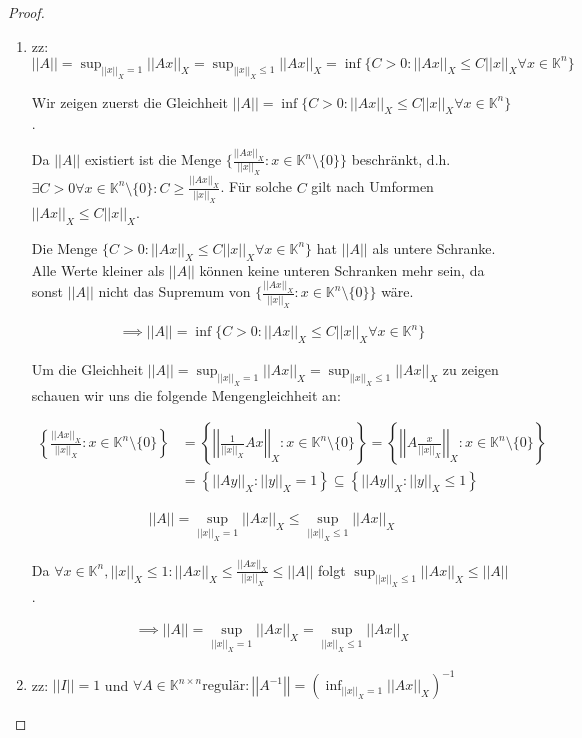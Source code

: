 \documentclass[]{article}
\newcommand{\norm}[1]{\left|\left|#1\right|\right|}
\newcommand{\normx}[1]{\norm{#1}_X}
\newcommand{\supo}{\sup_{\normx{x}=1}}
\newcommand{\supl}{\sup_{\normx{x}\leq1}}
\begin{document}
\begin{proof}
\begin{enumerate}[label=\alph*)]
		\item zz: $\norm{A}=\supo\normx{Ax}=\supl\normx{Ax}=\inf\{C>0: \normx{Ax}\leq C\normx{x} \forall x \in \mathbb{K}^n\}$
		
		Wir zeigen zuerst die Gleichheit $\norm{A}=\inf\{C>0: \normx{Ax}\leq C\normx{x} \forall x \in \mathbb{K}^n\}$.
		
		Da $\norm{A}$ existiert ist die Menge $\{\frac{\normx{Ax}}{\normx{x}}:x\in\mathbb{K}^n\setminus\{0\}\}$ beschränkt, d.h. $\exists C>0 \forall x\in\mathbb{K}^n\setminus\{0\} : C \geq \frac{\normx{Ax}}{\normx{x}}$. Für solche $C$ gilt nach Umformen $\normx{Ax}\leq C\normx{x}$.
		
		Die Menge $\{C>0:\normx{Ax}\leq C\normx{x} \forall x \in \mathbb{K}^n\}$ hat $\norm{A}$ als untere Schranke. Alle Werte kleiner als $\norm{A}$ können keine unteren Schranken mehr sein, da sonst $\norm{A}$ nicht das Supremum von $\{\frac{\normx{Ax}}{\normx{x}}:x\in\mathbb{K}^n\setminus\{0\}\}$ wäre.
		
		\begin{align*}
			\implies \norm{A} = \inf\{C>0: \normx{Ax}\leq C\normx{x} \forall x \in \mathbb{K}^n\}
		\end{align*}
	
		Um die Gleichheit $\norm{A}=\supo\normx{Ax}=\supl\normx{Ax}$ zu zeigen schauen wir uns die folgende Mengengleichheit an:
	
		\begin{align*}
			\left\{\frac{\normx{Ax}}{\normx{x}}:x\in\mathbb{K}^n\setminus\{0\}\right\} &= \left\{\normx{\frac{1}{\normx{x}}Ax}:x\in\mathbb{K}^n\setminus\{0\}\right\} = \left\{\normx{A\frac{x}{\normx{x}}}:x\in\mathbb{K}^n\setminus\{0\}\right\} \\
			&= \left\{\normx{Ay}:\normx{y}=1\right\} \subseteq \left\{\normx{Ay}:\normx{y}\leq1\right\}
		\end{align*}
	
		\begin{align*}
			\norm{A}=\supo\normx{Ax}\leq\supl\normx{Ax}
		\end{align*}
	
		Da $\forall x \in \mathbb{K}^n, \normx{x}\leq 1: \normx{Ax} \leq \frac{\normx{Ax}}{\normx{x}} \leq \norm{A}$ folgt $\supl\normx{Ax}\leq \norm{A}$.
		
		\begin{align*}
			\implies \norm{A} = \supo\normx{Ax} = \supl\normx{Ax}
		\end{align*}
	
		\item zz: $\norm{I} = 1$ und $\forall A \in \mathbb{K}^{n\times n} \text{regulär}: \norm{A^{-1}}=\left(\inf_{\normx{x}=1}\normx{Ax}\right)^{-1}$
		

\end{enumerate}
\end{proof}
\end{document}
